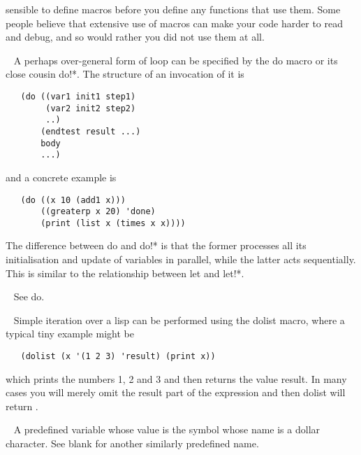 \begin{description}
sensible to define macros before you define any functions that use them.
Some people believe that extensive use of macros can make your code harder
to read and debug, and so would rather you did not use them at all.
\item[{\tx do~~~~~~~~~~~} \hspace{1cm} {\em macro}]~\newline
A perhaps over-general form of loop can be specified by the {\tx do} macro
or its close cousin {\tx do!*}. The structure of an invocation of it is
{\small\begin{verbatim}
   (do ((var1 init1 step1)
        (var2 init2 step2)
        ..)
       (endtest result ...)
       body
       ...)
\end{verbatim}}
\noindent and a concrete example is
{\small\begin{verbatim}
   (do ((x 10 (add1 x)))
       ((greaterp x 20) 'done)
       (print (list x (times x x))))
\end{verbatim}}
The difference between {\tx do} and {\tx do!*} is that the former processes
all its initialisation and update of variables in parallel, while the latter
acts sequentially. This is similar to the relationship between {\tx let} and
{\tx let!*}.
\item[{\tx do!*~~~~~~~~~} \hspace{1cm} {\em macro}]~\newline
See {\tx do}.
\item[{\tx dolist~~~~~~~} \hspace{1cm} {\em macro}]~\newline
Simple iteration over a lisp can be performed using the {\tx dolist} macro,
where a typical tiny example might be
{\small\begin{verbatim}
   (dolist (x '(1 2 3) 'result) (print x))
\end{verbatim}}
\noindent which prints the numbers 1, 2 and 3 and then returns the
value {\tx result}. In many cases you will merely omit the result part of the
expression and then {\tx dolist} will return \nil.
\item[{\tx dollar~~~~~~~} \hspace{1cm} {\em predefined variable}]~\newline
A predefined variable whose value is the symbol whose name is a dollar
character. See {\tx blank} for another similarly predefined name.
\item[{\tx dotimes~~~~~~} \hspace{1cm} {\em macro}]~\newline

\end{description}
